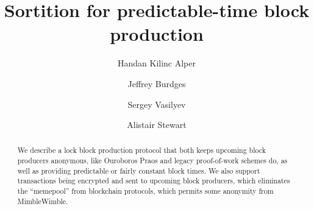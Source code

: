 \documentclass{article}
\title{Sortition for predictable-time block production}
\author{Handan Kilinc Alper \and Jeffrey Burdges \and Sergey Vasilyev \and Alistair Stewart}
\begin{document}
\maketitle

\begin{abstract}
We describe a lock block production protocol that both keeps upcoming block producers anonymous, like Ouroboros Praos and legacy proof-of-work schemes do, as well as providing predictable or fairly constant block times. 
We also support transactions being encrypted and sent to upcoming block producers, which eliminates the ``memepool'' from blockchain protocols, which permits some anonymity from MimbleWimble.
\end{abstract}







%
\end{document}
